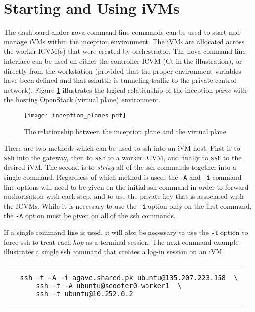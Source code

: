 \section{Starting and Using iVMs}
The dashboard and\/or nova command line commands can be used to start and manage iVMs within the inception environment.  
The iVMs are allocated across the worker ICVM(s) that were created by orchestrator.
The nova command line interface can be used on either the controller ICVM (Ct in the illustration), or directly from 
the workstation (provided that the proper environment variables have been defined and that sshuttle is tunneling traffic
to the private control network).  
Figure \ref{fg_planes} illustrates the logical relationship of the inception \emph{plane} with the hosting 
OpenStack (virtual plane) environment. 


\begin{figure}[!ht]
  \centering
  \texttt{[image: inception\_planes.pdf]}
  \tiny
  \caption{\small The relationship between the inception plane and the virtual plane.
    \label{fg_planes}\normalsize
  }
  \normalsize
\end{figure}

There are two methods which can be used to ssh into an iVM host. 
First is to \verb!ssh! into the gateway, then to \verb!ssh! to a worker ICVM, and finally to \verb!ssh! to the desired iVM. 
The second is to \emph{string} all of the ssh commands together into a single command.  
Regardless of which method is used, the \verb!-A! and \verb!-i! command line options will need to be given on the initial
ssh command in order to forward authorisation with each step, and to use the private key that is associated with the ICVMs. 
While it is necessary to use the \verb!-i! option only on the first command, the \verb!-A! option must be given on all of the
ssh commands.  

If a single command line is used, it will also be necessary to use the \verb!-t! option to force ssh to treat each \emph{hop} as 
a terminal session.  
The next command example illustrates a single ssh command that creates a log-in session on an iVM.

\small\begin{tabular}{p{\textwidth}}\begin{verbatim}
   ssh -t -A -i agave.shared.pk ubuntu@135.207.223.158  \
       ssh -t -A ubuntu@scooter0-worker1  \
       ssh -t ubuntu@10.252.0.2
\end{verbatim}
\end{tabular}
\normalsize


